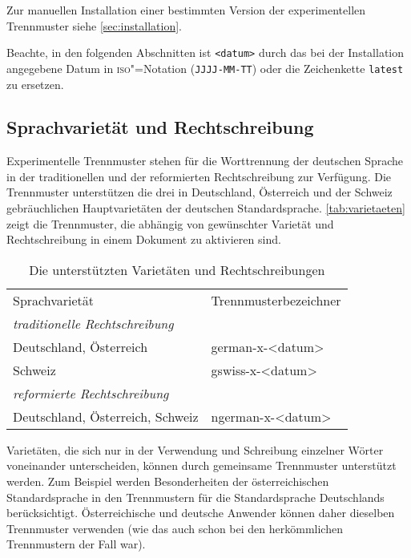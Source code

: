 \documentclass[11pt,
               DIV=9,
               toc=flat,
               captions=tableheading,
               abstract=on]{scrartcl}
\newcommand*{\Abk}[1]{\mbox{\textsc{\lsstyle#1}}}
\newcommand*{\Programm}[1]{\lstinline[style=shell]{#1}}
\begin{document}
Zur manuellen Installation einer bestimmten Version der
experimentellen Trennmuster siehe \autoref{sec:installation}.

Beachte, in den folgenden Abschnitten ist \verb+<datum>+ durch das bei
der Installation angegebene Datum in \Abk{iso}"=Notation
(\verb+JJJJ-MM-TT+) oder die Zeichenkette \verb+latest+ zu ersetzen.


\subsection{Sprachvarietät und Rechtschreibung}
\label{sec:varietaeten}

Experimentelle Trennmuster stehen für die Worttrennung der deutschen
Sprache in der traditionellen und der reformierten Rechtschreibung zur
Verfügung.  Die Trennmuster unterstützen die drei in Deutschland,
Österreich und der Schweiz gebräuchlichen Hauptvarietäten der
deutschen Standardsprache.  \autoref{tab:varietaeten} zeigt die
Trennmuster, die abhängig von gewünschter Varietät und Rechtschreibung
in einem Dokument zu aktivieren sind.

\begin{table}
  \centering
  \caption{Die unterstützten Varietäten und Rechtschreibungen}
  \label{tab:varietaeten}
  \begin{tabular}{l>{\ttfamily}l}
    \normalfont Sprachvarietät
    & Trennmusterbezeichner\\
    \addlinespace\toprule\addlinespace
    \hspace*{-\tabcolsep}\normalfont\emph{traditionelle Rechtschreibung}\\
    Deutschland, Österreich
    & german-x-<datum>\\
    Schweiz
    & gswiss-x-<datum>\\\addlinespace
    \hspace*{-\tabcolsep}\normalfont\emph{reformierte Rechtschreibung}\\
    Deutschland, Österreich, Schweiz
    & ngerman-x-<datum>\\
  \end{tabular}
\end{table}

Varietäten, die sich nur in der Verwendung und Schreibung einzelner
Wörter voneinander unterscheiden, können durch gemeinsame Trennmuster
unterstützt werden.
Zum Beispiel werden Besonderheiten der österreichischen
Standardsprache in den Trennmustern für die Standardsprache
Deutschlands berücksichtigt.  Österreichische und deutsche Anwender
können daher dieselben Trennmuster verwenden (wie das auch schon bei
den herkömmlichen Trennmustern der Fall war).
\end{document}
